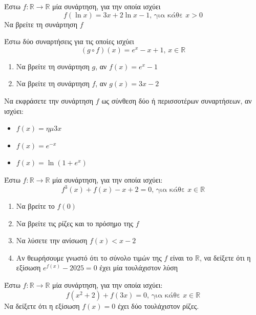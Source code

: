 \documentclass{presentation}
\begin{document}
\begin{askisi}
  Έστω $f:\mathbb{R}\to\mathbb{R}$ μία συνάρτηση, για την οποία ισχύει
  $$f(\ln x)=3x+2\ln x -1\text{, για κάθε } x>0$$
  Να βρείτε τη συνάρτηση $f$

\end{askisi}

\begin{askisi}
  Έστω δύο συναρτήσεις για τις οποίες ισχύει
  $$(g\circ f)(x)=e^x-x+1\text{, } x\in\mathbb{R}$$
  \begin{enumerate}
    \item<1-> Να βρείτε τη συνάρτηση $g$, αν $f(x)=e^x-1$
    \item<2-> Να βρείτε τη συνάρτηση $f$, αν $g(x)=3x-2$
  \end{enumerate}

\end{askisi}

\begin{askisi}
  Να εκφράσετε την συνάρτηση $f$ ως σύνθεση δύο ή περισσοτέρων συναρτήσεων, αν ισχύει:
  \begin{itemize}
    \item $f(x)=ημ 3x$
    \item $f(x)=e^{-x}$
    \item $f(x)=\ln (1+e^x)$
  \end{itemize}

\end{askisi}

\begin{askisi}
  Έστω $f:\mathbb{R}\to\mathbb{R}$ μία συνάρτηση, για την οποία ισχύει:
  $$f^3(x)+f(x)-x+2=0\text{, για κάθε } x\in\mathbb{R}$$
  \begin{enumerate}
    \item<1-> Να βρείτε το $f(0)$
    \item<2-> Να βρείτε τις ρίζες και το πρόσημο της $f$
    \item<3-> Να λύσετε την ανίσωση $f(x)<x-2$
    \item<4-> Αν θεωρήσουμε γνωστό ότι το σύνολο τιμών της $f$ είναι το $\mathbb{R}$, να δείξετε ότι η εξίσωση $e^{f(x)}-2025=0$ έχει μία τουλάχιστον λύση
  \end{enumerate}

\end{askisi}

\begin{askisi}
  Έστω $f:\mathbb{R}\to\mathbb{R}$ μία συνάρτηση, για την οποία ισχύει:
  $$f(x^2+2)+f(3x)=0 \text{, για κάθε } x\in\mathbb{R}$$
  Να δείξετε ότι η εξίσωση $f(x)=0$ έχει δύο τουλάχιστον ρίζες.

\end{askisi}
\end{document}
